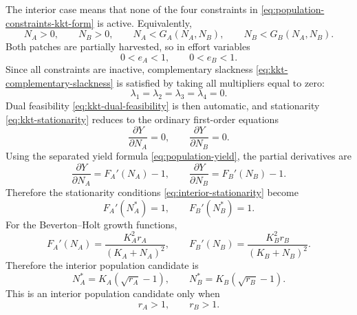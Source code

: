 \documentclass{article}
\numberwithin{equation}{section}
\begin{document}
The interior case means that none of the four constraints in
\eqref{eq:population-constraints-kkt-form} is active. Equivalently,
\begin{equation*}
    N_A>0,\qquad N_B>0,\qquad N_A<G_A(N_A,N_B),\qquad
    N_B<G_B(N_A,N_B).
\end{equation*}
Both patches are partially harvested, so in effort variables
\begin{equation*}
    0<e_A<1,
    \qquad
    0<e_B<1.
\end{equation*}
Since all constraints are inactive, complementary slackness
\eqref{eq:kkt-complementary-slackness} is satisfied by taking all
multipliers equal to zero:
\begin{equation*}
    \lambda_1=\lambda_2=\lambda_3=\lambda_4=0.
\end{equation*}
Dual feasibility \eqref{eq:kkt-dual-feasibility} is then automatic,
and stationarity \eqref{eq:kkt-stationarity} reduces to the ordinary
first-order equations
\begin{equation}
    \label{eq:interior-stationarity}
    \frac{\partial Y}{\partial N_A}=0,
    \qquad
    \frac{\partial Y}{\partial N_B}=0.
\end{equation}
Using the separated yield formula \eqref{eq:population-yield}, the
partial derivatives are
\begin{equation}
    \label{eq:interior-yield-partials}
    \frac{\partial Y}{\partial N_A}=F_A'(N_A)-1,
    \qquad
    \frac{\partial Y}{\partial N_B}=F_B'(N_B)-1.
\end{equation}
Therefore the stationarity conditions
\eqref{eq:interior-stationarity} become
\begin{equation}
    \label{eq:interior-marginal-equations}
    F_A'(N_A^*)=1,
    \qquad
    F_B'(N_B^*)=1.
\end{equation}
For the Beverton--Holt growth functions,
\begin{equation}
    \label{eq:beverton-holt-derivatives}
    F_A'(N_A)=\frac{K_A^2r_A}{(K_A+N_A)^2},
    \qquad
    F_B'(N_B)=\frac{K_B^2r_B}{(K_B+N_B)^2}.
\end{equation}
Therefore the interior population candidate is
\begin{equation}
    \label{eq:interior-populations}
    N_A^*=K_A(\sqrt{r_A}-1),
    \qquad
    N_B^*=K_B(\sqrt{r_B}-1).
\end{equation}
This is an interior population candidate only when
\begin{equation}
    \label{eq:interior-r-condition}
    r_A>1,
    \qquad
    r_B>1.
\end{equation}
\end{document}
